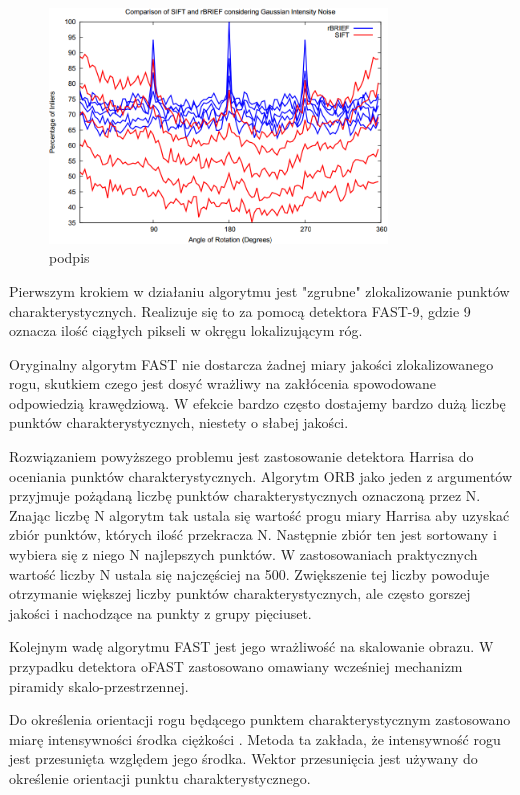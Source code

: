 \begin{figure}
\centering
\includegraphics[width=0.8\textwidth]{pict/02/orb/orb_wykres_8.png}
\caption{podpis}
\label{fig:orb_wykres_8}
\end{figure}

Pierwszym krokiem w działaniu algorytmu jest "zgrubne" zlokalizowanie punktów charakterystycznych. Realizuje się to za pomocą detektora FAST-9, gdzie 9 oznacza ilość ciągłych pikseli w okręgu lokalizującym róg.

Oryginalny algorytm FAST nie dostarcza żadnej miary jakości zlokalizowanego rogu,  skutkiem czego jest dosyć wrażliwy na zakłócenia spowodowane odpowiedzią krawędziową. W efekcie bardzo często dostajemy bardzo dużą liczbę punktów charakterystycznych, niestety o słabej jakości. 

Rozwiązaniem powyższego problemu jest zastosowanie detektora Harrisa do oceniania punktów charakterystycznych. Algorytm ORB jako jeden z argumentów przyjmuje pożądaną liczbę punktów charakterystycznych oznaczoną przez N. Znając liczbę N algorytm tak ustala się wartość progu miary Harrisa aby uzyskać zbiór punktów, których ilość przekracza N. Następnie zbiór ten jest sortowany i wybiera się z niego N najlepszych punktów. W zastosowaniach praktycznych wartość liczby N ustala się najczęściej na 500. Zwiększenie tej liczby powoduje otrzymanie większej liczby punktów charakterystycznych, ale często gorszej jakości i nachodzące na punkty z grupy pięciuset.

Kolejnym wadę algorytmu FAST jest jego wrażliwość na skalowanie obrazu. W przypadku detektora oFAST zastosowano omawiany wcześniej mechanizm piramidy skalo-przestrzennej.

Do określenia orientacji rogu będącego punktem charakterystycznym zastosowano miarę intensywności środka ciężkości \cite{centroid}. Metoda ta zakłada, że intensywność rogu jest przesunięta względem jego środka. Wektor przesunięcia jest używany do określenie orientacji punktu charakterystycznego. 

